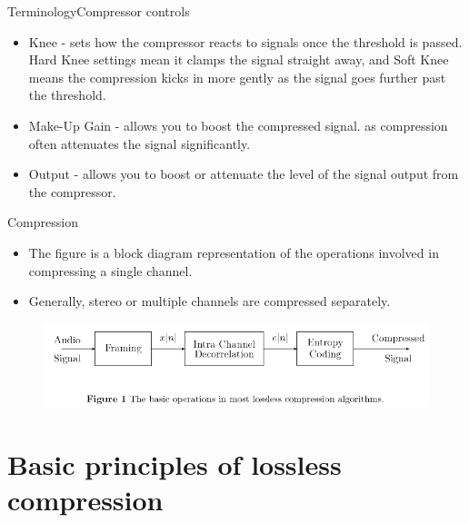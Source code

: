 \documentclass{beamer}
\begin{document}
\begin{frame}{Terminology}{Compressor controls}
	\begin{itemize}
		\item{
				Knee - sets how the compressor reacts to signals once the threshold is passed. Hard Knee settings mean it clamps the signal straight away, and Soft Knee means the compression kicks in more gently as the signal goes further past the threshold.
			}
			\item{
				Make-Up Gain - allows you to boost the compressed signal. as compression often attenuates the signal significantly.
			}
			\item{
				Output - allows you to boost or attenuate the level of the signal output from the compressor.
			}
	\end{itemize}
\end{frame}


\begin{frame}{Compression}
  \begin{itemize}
  \item {
    The figure is a block diagram representation of the operations involved in compressing a single channel.
  }
  \item{
  	Generally, stereo or multiple channels are compressed separately.
  }
  \end{itemize}
  \begin{figure}
		\includegraphics[scale=0.42]{fig1.png}
	\end{figure}  
\end{frame}

\section{ Basic principles of lossless compression}
\end{document}
